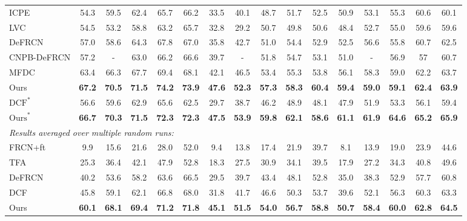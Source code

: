 \documentclass{article}
\begin{document}
\begin{table*}[!hbt]
\begin{adjustbox}{width=1\textwidth}
{\begin{tabular}{l|ccccc|ccccc|ccccc}
     ICPE \cite{ICPE} & 54.3 & 59.5 &62.4 & 65.7 & 66.2 & 33.5 &40.1& 48.7 &51.7& 52.5 & 50.9 &53.1&55.3&60.6&60.1  \\
     LVC \cite{LVC} & 54.5 &53.2 & 58.8 & 63.2 & 65.7 &32.8& 29.2 &50.7& 49.8 & 50.6 &48.4&52.7&55.0&59.6&59.6  \\
    DeFRCN \cite{defrcn} &57.0 &58.6&64.3&67.8&67.0&35.8&42.7&51.0&54.4&52.9&52.5&56.6&55.8&60.7&62.5 \\
     CNPB-DeFRCN \cite{CNPB} & 57.2 &- & 63.0 & 66.2 & 66.6 &39.7& - &51.8& 54.7 & 53.1 &51.0&-&56.9&57&60.7  \\
     MFDC \cite{MFD} & 63.4 &66.3 & 67.7 & 69.4 & 68.1 &42.1& 46.5 &53.4& 55.3 & 53.8 &56.1&58.3&59.0&62.2&63.7  \\
    \rowcolor{Gray}
    Ours   &{\bf 67.2}&{\bf 70.5}&{\bf 71.5}&{\bf 74.2}&{\bf 73.9}&{\bf 47.6}&{\bf 52.3}&{\bf 57.3}&{\bf 58.3}&{\bf 60.4}&{\bf 59.4}&{\bf 59.0}&{\bf 59.1}&{\bf 62.4}&{\bf 63.9}\\
    \hline 
    $\text{DCF}^{*}$ \cite{dcf}   &56.6&59.6&62.9&65.6&62.5&29.7&38.7&46.2&48.9&48.1&47.9&51.9&53.3&56.1&59.4 \\
    \rowcolor{Gray}
    $\text{Ours}^{*}$   &{\bf 66.7}&{\bf 70.3}&{\bf 71.5}&{\bf 72.3}&{\bf 72.3}&{\bf 47.5}&{\bf 53.9}&{\bf 59.8}&{\bf 62.1}&{\bf 58.6}&{\bf 61.1}&{\bf 61.9}&{\bf 64.6}&{\bf 65.2}&{\bf 65.9}\\
    \midrule 
\multicolumn{16}{l}{\textit{Results averaged over multiple random runs:}}\\
    FRCN+ft \cite{metarcnn} & 9.9& 15.6  &21.6  &28.0  &52.0  &9.4& 13.8& 17.4&21.9& 39.7 &8.1&13.9&19.0&23.9&44.6\\
    TFA  \cite{tfa} & 25.3 & 36.4 & 42.1 & 47.9 & 52.8 & 18.3 & 27.5 & 30.9 & 34.1 & 39.5 & 17.9 & 27.2 & 34.3 & 40.8 & 49.6 \\
    DeFRCN \cite{defrcn}  &40.2 & 53.6 & 58.2 & 63.6 & 66.5 &29.5&39.7&43.4&48.1&52.8& 35.0 & 38.3 & 52.9 & 57.7 & 60.8 \\
    DCF  \cite{dcf} & 45.8&59.1&62.1&66.8&68.0&31.8&41.7&46.6&50.3&53.7&39.6&52.1&56.3&60.3&63.3\\
    \rowcolor{Gray}
    Ours   & {\bf 60.1}& {\bf 68.1} & {\bf 69.4} & {\bf 71.2} & {\bf 71.8} & {\bf 45.1} & {\bf 51.5} & {\bf 54.0} & {\bf 56.7} & {\bf 58.8} & {\bf 50.7} & {\bf 58.4} & {\bf 60.0} & {\bf 62.8} & {\bf 64.5} \\
    \bottomrule

  \end{tabular}
  }
\end{adjustbox}
\label{tab:PascalVOC1}
\end{table*}
\end{document}
